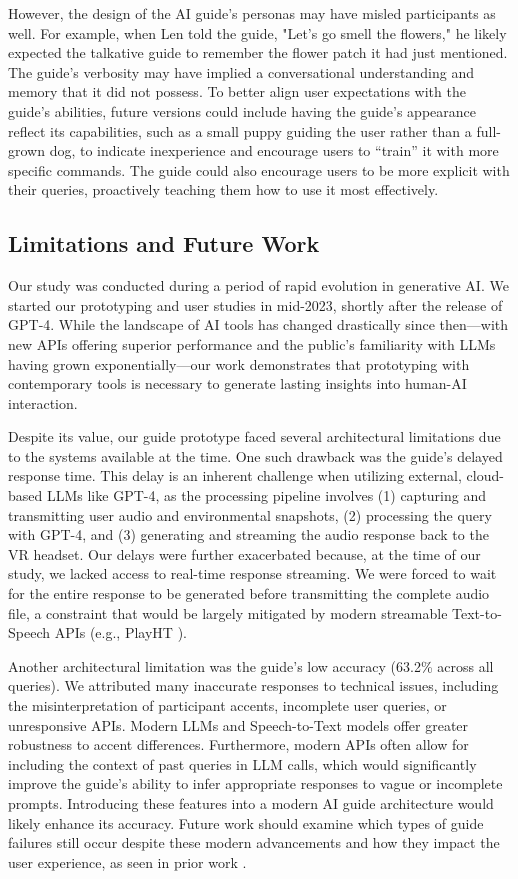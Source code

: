 However, the design of the AI guide's personas may have misled participants as well. For example, when Len told the guide, "Let's go smell the flowers," he likely expected the talkative guide to remember the flower patch it had just mentioned. The guide's verbosity may have implied a conversational understanding and memory that it did not possess. To better align user expectations with the guide's abilities, future versions could include having the guide's appearance reflect its capabilities, such as a small puppy guiding the user rather than a full-grown dog, to indicate inexperience and encourage users to “train” it with more specific commands. The guide could also encourage users to be more explicit with their queries, proactively teaching them how to use it most effectively.

\subsection{Limitations and Future Work} \label{sec: Limitations and Future Work}

Our study was conducted during a period of rapid evolution in generative AI. We started our prototyping and user studies in mid-2023, shortly after the release of GPT-4. While the landscape of AI tools has changed drastically since then—with new APIs offering superior performance and the public’s familiarity with LLMs having grown exponentially—our work demonstrates that prototyping with contemporary tools is necessary to generate lasting insights into human-AI interaction.

Despite its value, our guide prototype faced several architectural limitations due to the systems available at the time. One such drawback was the guide's delayed response time. This delay is an inherent challenge when utilizing external, cloud-based LLMs like GPT-4, as the processing pipeline involves (1) capturing and transmitting user audio and environmental snapshots, (2) processing the query with GPT-4, and (3) generating and streaming the audio response back to the VR headset. Our delays were further exacerbated because, at the time of our study, we lacked access to real-time response streaming. We were forced to wait for the entire response to be generated before transmitting the complete audio file, a constraint that would be largely mitigated by modern streamable Text-to-Speech APIs (e.g., PlayHT \cite{playhtapi}).

Another architectural limitation was the guide's low accuracy (63.2\% across all queries). We attributed many inaccurate responses to technical issues, including the misinterpretation of participant accents, incomplete user queries, or unresponsive APIs. Modern LLMs and Speech-to-Text models offer greater robustness to accent differences. Furthermore, modern APIs often allow for including the context of past queries in LLM calls, which would significantly improve the guide's ability to infer appropriate responses to vague or incomplete prompts. Introducing these features into a modern AI guide architecture would likely enhance its accuracy. Future work should examine which types of guide failures still occur despite these modern advancements and how they impact the user experience, as seen in prior work \cite{goetsu2020different}.

